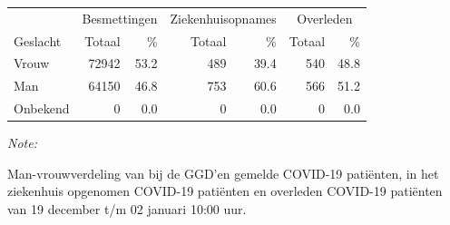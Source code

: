 \documentclass[
  english,
  man,floatsintext]{apa6}
\begin{document}
\begin{table}[H]
\centering\begingroup\fontsize{11}{13}\selectfont

\begin{threeparttable}
\begin{tabular}{lrrrrrr}
\toprule
\multicolumn{1}{c}{ } & \multicolumn{2}{c}{Besmettingen} & \multicolumn{2}{c}{Ziekenhuisopnames} & \multicolumn{2}{c}{Overleden} \\
\cmidrule(l{3pt}r{3pt}){2-3} \cmidrule(l{3pt}r{3pt}){4-5} \cmidrule(l{3pt}r{3pt}){6-7}
Geslacht & Totaal & \% & Totaal & \% & Totaal & \%\\
\midrule
Vrouw & 72942 & 53.2 & 489 & 39.4 & 540 & 48.8\\
Man & 64150 & 46.8 & 753 & 60.6 & 566 & 51.2\\
Onbekend & 0 & 0.0 & 0 & 0.0 & 0 & 0.0\\
\bottomrule
\end{tabular}
\begin{tablenotes}
\item \textit{Note: } 
\item Man-vrouwverdeling van bij de GGD’en gemelde COVID-19 patiënten, in het ziekenhuis opgenomen COVID-19 patiënten en overleden COVID-19 patiënten van 19 december t/m 02 januari 10:00 uur.
\end{tablenotes}
\end{threeparttable}
\endgroup{}
\end{table}
\newpage
\end{document}
